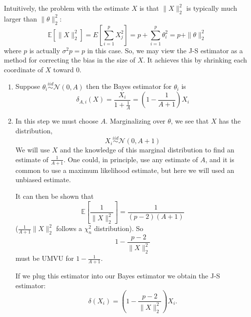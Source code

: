 \begin{rem}
    Intuitively, the problem with the estimate $X$ is that $\|X\|_2^2$ is typically much larger than $\|\theta\|_2^2$:
    \[
    \mathbb{E}[\|X\|_2^2] = E\left[\sum_{i=1}^{p} X_j^2\right] = p + \sum_{i=1}^{p} \theta_i^2 = p + \|\theta\|_2^2
    \]
    where $p$ is actually $\sigma^2 p = p$ in this case. So, we may view the J-S estimator as a method for correcting the bias in the size of $X$. It achieves this by shrinking each coordinate of $X$ toward 0.
    \begin{enumerate}
    \item Suppose $\theta_i \stackrel{iid}{\sim} \mathcal{N}(0, A)$ then the Bayes estimator for $\theta_i$ is
    \[
    \delta_{A,i}(X) = \frac{X_i}{1 + \frac{1}{A}} = \left(1 - \frac{1}{A+1}\right) X_i
    \]
    
    \item In this step we must choose $A$. Marginalizing over $\theta$, we see that $X$ has the distribution,
    \[
    X_i \stackrel{iid}{\sim} \mathcal{N}(0, A+1)
    \]
    We will use $X$ and the knowledge of this marginal distribution to find an estimate of $\frac{1}{A+1}$. One could, in principle, use any estimate of $A$, and it is common to use a maximum likelihood estimate, but here we will used an unbiased estimate.
    
    It can then be shown that
    \[
    \mathbb{E}\left[\frac{1}{\|X\|_2^2}\right] = \frac{1}{(p-2)(A+1)}
    \]
    ($\frac{1}{A+1}\|X\|_2^2$ follows a $\chi_n^2$ distribution). So
    \[
    1 - \frac{p-2}{\|X\|_2^2}
    \]
    must be UMVU for $1 - \frac{1}{A+1}$.
    
    If we plug this estimator into our Bayes estimator we obtain the J-S estimator:
    \[
    \delta(X_i) = \left(1 - \frac{p-2}{\|X\|_2^2}\right) X_i.
    \]
\end{enumerate}
\end{rem}

